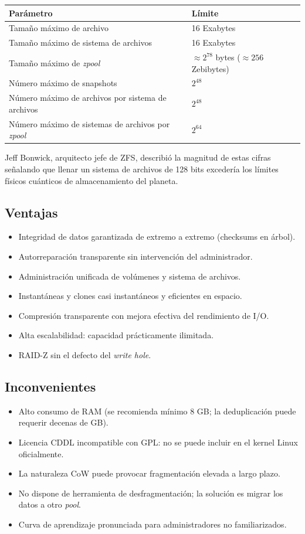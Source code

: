 \documentclass[12pt,letterpaper]{article}
\begin{document}
\begin{center}
  \begin{tabular}{ll}
    \hline
    \textbf{Parámetro} & \textbf{Límite} \\
    \hline
    Tamaño máximo de archivo & 16 Exabytes \\
    Tamaño máximo de sistema de archivos & 16 Exabytes \\
    Tamaño máximo de \emph{zpool} & $\approx 2^{78}$ bytes ($\approx 256$ Zebibytes) \\
    Número máximo de snapshots & $2^{48}$ \\
    Número máximo de archivos por sistema de archivos & $2^{48}$ \\
    Número máximo de sistemas de archivos por \emph{zpool} & $2^{64}$ \\
    \hline
  \end{tabular}
\end{center}

Jeff Bonwick, arquitecto jefe de ZFS, describió la magnitud de estas cifras señalando que llenar un sistema de archivos de 128 bits excedería los límites físicos cuánticos de almacenamiento del planeta.

\subsection{Ventajas}
\begin{itemize}
\item Integridad de datos garantizada de extremo a extremo (checksums en árbol).
\item Autorreparación transparente sin intervención del administrador.
\item Administración unificada de volúmenes y sistema de archivos.
\item Instantáneas y clones casi instantáneos y eficientes en espacio.
\item Compresión transparente con mejora efectiva del rendimiento de I/O.
\item Alta escalabilidad: capacidad prácticamente ilimitada.
\item RAID-Z sin el defecto del \emph{write hole}.
\end{itemize}

\subsection{Inconvenientes}
\begin{itemize}
\item Alto consumo de RAM (se recomienda mínimo 8 GB; la deduplicación puede requerir decenas de GB).
\item Licencia CDDL incompatible con GPL: no se puede incluir en el kernel Linux oficialmente.
\item La naturaleza CoW puede provocar fragmentación elevada a largo plazo.
\item No dispone de herramienta de desfragmentación; la solución es migrar los datos a otro \emph{pool}.
\item Curva de aprendizaje pronunciada para administradores no familiarizados.
\end{itemize}
\end{document}

